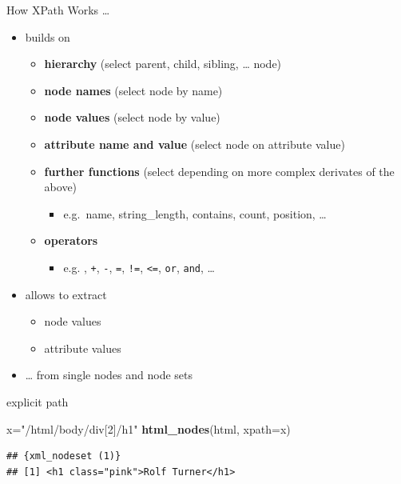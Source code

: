\documentclass[ignorenonframetext,]{beamer}
\newenvironment{Shaded}{\begin{snugshade}}{\end{snugshade}}
\newcommand{\KeywordTok}[1]{\textcolor[rgb]{0.13,0.29,0.53}{\textbf{{#1}}}}
\newcommand{\DataTypeTok}[1]{\textcolor[rgb]{0.13,0.29,0.53}{{#1}}}
\newcommand{\StringTok}[1]{\textcolor[rgb]{0.31,0.60,0.02}{{#1}}}
\newcommand{\NormalTok}[1]{{#1}}
\providecommand{\tightlist}{%
  \setlength{\itemsep}{0pt}\setlength{\parskip}{0pt}}
\begin{document}
\begin{frame}[fragile]{How XPath Works \ldots{}}

\begin{itemize}
\tightlist
\item
  builds on

  \begin{itemize}
  \tightlist
  \item
    \textbf{hierarchy} (select parent, child, sibling, \ldots{} node)
  \item
    \textbf{node names} (select node by name)
  \item
    \textbf{node values} (select node by value)
  \item
    \textbf{attribute name and value} (select node on attribute value)
  \item
    \textbf{further functions} (select depending on more complex
    derivates of the above)

    \begin{itemize}
    \tightlist
    \item
      e.g.~name, string\_length, contains, count, position, \ldots{}
    \end{itemize}
  \item
    \textbf{operators}

    \begin{itemize}
    \tightlist
    \item
      e.g. \texttt{\textbar{}}, \texttt{+}, \texttt{-}, \texttt{=},
      \texttt{!=}, \texttt{\textless{}=}, \texttt{or}, \texttt{and},
      \ldots{}
    \end{itemize}
  \end{itemize}
\item
  allows to extract

  \begin{itemize}
  \tightlist
  \item
    node values
  \item
    attribute values
  \end{itemize}
\item
  \ldots{} from single nodes and node sets
\end{itemize}

\end{frame}

\begin{frame}[fragile]{explicit path}

\begin{Shaded}
\begin{Highlighting}[]
\NormalTok{x=}\StringTok{"/html/body/div[2]/h1"}
\KeywordTok{html_nodes}\NormalTok{(html, }\DataTypeTok{xpath=}\NormalTok{x)}
\end{Highlighting}
\end{Shaded}

\begin{verbatim}
## {xml_nodeset (1)}
## [1] <h1 class="pink">Rolf Turner</h1>
\end{verbatim}

\end{frame}
\end{document}

